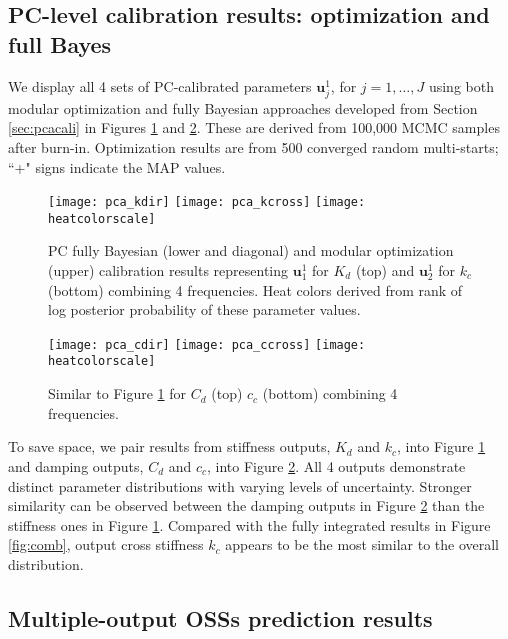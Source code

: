 \documentclass[12pt]{article}
\begin{document}
{\subsection{PC-level  calibration results: optimization and full Bayes}
\label{sec:pcap}

We  display all 4 sets of PC-calibrated parameters $\mathbf{u}^1_j$, for $j = 1, \dots, J$
using both modular optimization and fully Bayesian approaches developed from 
Section \ref{sec:pcacali} in Figures \ref{fig:pca_1} and \ref{fig:pca_2}. 
These are derived from 100,000 MCMC samples after burn-in. 
Optimization results are from  500 converged random multi-starts; 
``+" signs indicate the MAP values. 
\begin{figure}[ht!]
\centering
\texttt{[image: pca\_kdir]}
\texttt{[image: pca\_kcross]}
\texttt{[image: heatcolorscale]}
\caption{PC fully Bayesian (lower and diagonal) and modular optimization (upper)
calibration results representing $\mathbf{u}^1_1$ for $K_d$ (top) 
and $\mathbf{u}^1_2$ for $k_c$ (bottom) combining 4 frequencies. 
Heat colors derived from rank of log posterior probability of these parameter values.}
\label{fig:pca_1}%
\end{figure}
\begin{figure}[ht!]
\centering
\texttt{[image: pca\_cdir]}
\texttt{[image: pca\_ccross]}
\texttt{[image: heatcolorscale]}
\caption{Similar to Figure \ref{fig:pca_1} for $C_d$ (top) 
$c_c$ (bottom) combining 4 frequencies.}
\label{fig:pca_2}%
\end{figure}
To save space, we pair results from stiffness outputs, $K_d$ and $k_c$,
into Figure  \ref{fig:pca_1}  and damping outputs, $C_d$ and $c_c$,
into Figure  \ref{fig:pca_2}. All 4 outputs demonstrate distinct parameter
distributions with varying levels of uncertainty. 
Stronger similarity can be observed between the damping outputs in Figure \ref{fig:pca_2}
than the stiffness ones in Figure \ref{fig:pca_1}. Compared with the 
fully integrated results in Figure \ref{fig:comb}, output cross stiffness $k_c$
appears to be the most similar to the overall distribution. 


\subsection{Multiple-output OSSs prediction results}
\label{sec:pred}

}
\end{document}
